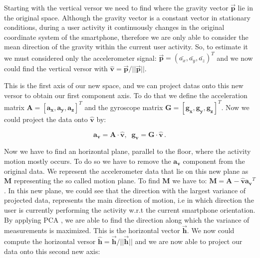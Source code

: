 Starting with the vertical versor we need to find where the gravity vector $\boldsymbol{\vec{p}}$ lie in the original space. Although the gravity vector is a constant vector in stationary conditions, during a user activity it continuously changes in the original coordinate system of the smartphone, therefore we are only able to consider the mean direction of the gravity within the current user activity. So, to estimate it we must considered only the accelerometer signal: \mbox{$ \boldsymbol{\vec{p}} = (\bar{a_{x}}, \bar{a_{y}}, \bar{a_{z}})^{T}$}  and we now could find the vertical versor with \mbox{$ \boldsymbol{\hat{v}} = \boldsymbol{\vec{p}} / ||\boldsymbol{\vec{p}}|| $}.

This is the first axis of our new space, and we can project datas onto this new versor to obtain our first component axis. To do that we define the acceleration matrix \mbox{$\boldsymbol{A} = [ \boldsymbol{a_{x}}, \boldsymbol{a_{y}}, \boldsymbol{a_{z}} ]^{T}$} and the gyroscope matrix \mbox{$\boldsymbol{G} = [ \boldsymbol{g_{x}}, \boldsymbol{g_{y}}, \boldsymbol{g_{z}} ]^{T} $}. Now we could project the data onto $\boldsymbol{\hat{v}}$ by:

\begin{equation}
	\label{v-axis eq}
	 \boldsymbol{a_{v}} = \boldsymbol{A} \cdot \boldsymbol{\hat{v}} ,\;\; \boldsymbol{g_{v}} = \boldsymbol{G} \cdot \boldsymbol{\hat{v}} \,.
\end{equation}

Now we have to find an horizontal plane, parallel to the floor, where the activity motion mostly occurs. To do so we have to remove the  $\boldsymbol{a_{v}}$ component from the original data. We represent the accelerometer data that lie on this new plane as $\boldsymbol{M}$ representing the so called motion plane. To find $\boldsymbol{M}$ we have to: \mbox{$\boldsymbol{M} = \boldsymbol{A} - \boldsymbol{\hat{v}} \boldsymbol{a_{v}}^{T} $}. In this new plane, we could see that the direction with the largest variance of projected data, represents the main direction of motion, i.e in which direction the user is currently performing the activity w.r.t the current smartphone orientation. By applying PCA \cite{rao1964use}, we are able to find the direction along which the variance of measurements is maximized. This is the horizontal vector $\boldsymbol{\vec{h}}$. We now could compute the horizontal versor \mbox{$ \boldsymbol{\hat{h}} = \boldsymbol{\vec{h}} / ||\boldsymbol{\vec{h}}|| $} and we are now able to project our data onto this second new axis:

